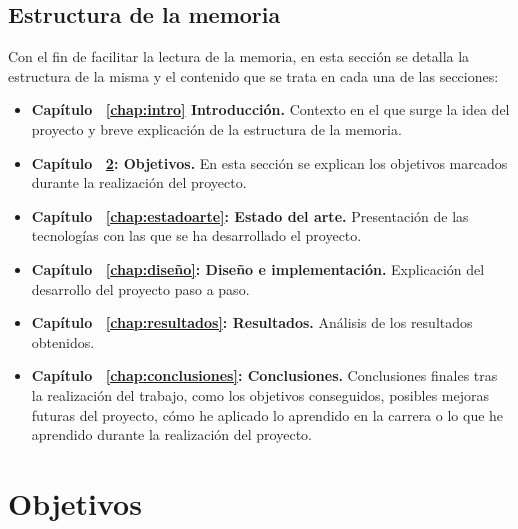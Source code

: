 \documentclass[a4paper, 12pt]{book}
\begin{document}
\section{Estructura de la memoria}
\label{sec:estructura}
Con el fin de facilitar la lectura de la memoria, en esta sección se detalla la estructura de la misma y el contenido que se trata en cada una de las secciones:
\begin{itemize}
  \item \textbf{Capítulo ~\ref{chap:intro} Introducción.} Contexto en el que surge la idea del proyecto y breve explicación de la estructura de la memoria.

  \item \textbf{Capítulo ~\ref{chap:objetivos}: Objetivos.} En esta sección se explican los objetivos marcados durante la realización del proyecto.

  \item \textbf{Capítulo ~\ref{chap:estadoarte}: Estado del arte.} Presentación de las tecnologías con las que se ha desarrollado el proyecto.
  
  \item \textbf{Capítulo ~\ref{chap:diseño}: Diseño e implementación.} Explicación del desarrollo del proyecto paso a paso.

  \item \textbf{Capítulo ~\ref{chap:resultados}: Resultados.} Análisis de los resultados obtenidos.
  
  \item \textbf{Capítulo ~\ref{chap:conclusiones}: Conclusiones.} Conclusiones finales tras la realización del trabajo, como los objetivos conseguidos, posibles mejoras futuras del proyecto, cómo he aplicado lo aprendido en la carrera o lo que he aprendido durante la realización del proyecto.
\end{itemize}




\cleardoublepage %
\chapter{Objetivos} %
\label{chap:objetivos} %
\end{document}
